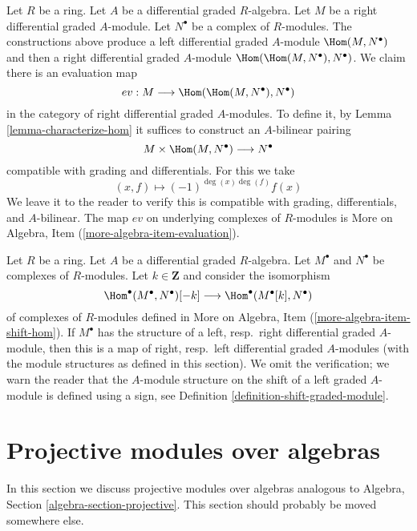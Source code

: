 \begin{remark}
\label{remark-evaluation-map-right}
Let $R$ be a ring. Let $A$ be a differential graded $R$-algebra.
Let $M$ be a right differential graded $A$-module. Let
$N^\bullet$ be a complex of $R$-modules. The constructions above
produce a left differential graded $A$-module $\Hom(M, N^\bullet)$
and then a right differential graded $A$-module
$\Hom(\Hom(M, N^\bullet), N^\bullet)$. We claim there is an evaluation map
$$
ev : M \longrightarrow \Hom(\Hom(M, N^\bullet), N^\bullet)
$$
in the category of right differential graded $A$-modules. To define it, by
Lemma \ref{lemma-characterize-hom} it suffices to construct an
$A$-bilinear pairing
$$
M \times \Hom(M, N^\bullet) \longrightarrow N^\bullet
$$
compatible with grading and differentials. For this we take
$$
(x, f) \longmapsto (-1)^{\deg(x)\deg(f)}f(x)
$$
We leave it to the reader to verify this is compatible with grading,
differentials, and $A$-bilinear. The map $ev$ on underlying complexes
of $R$-modules is More on Algebra, Item (\ref{more-algebra-item-evaluation}).
\end{remark}

\begin{remark}
\label{remark-shift-dual}
Let $R$ be a ring. Let $A$ be a differential graded $R$-algebra.
Let $M^\bullet$ and $N^\bullet$ be complexes of $R$-modules.
Let $k \in \mathbf{Z}$ and consider the isomorphism
$$
\Hom^\bullet(M^\bullet, N^\bullet)[-k]
\longrightarrow
\Hom^\bullet(M^\bullet[k], N^\bullet)
$$
of complexes of $R$-modules defined in
More on Algebra, Item (\ref{more-algebra-item-shift-hom}).
If $M^\bullet$ has the structure of a left, resp.\ right
differential graded $A$-module, then this is a map of
right, resp.\ left differential graded $A$-modules (with the
module structures as defined in this section).
We omit the verification; we warn the reader that the
$A$-module structure on the shift of a left graded $A$-module
is defined using a sign, see
Definition \ref{definition-shift-graded-module}.
\end{remark}






\section{Projective modules over algebras}
\label{section-projectives-over-algebras}

\noindent
In this section we discuss projective modules over algebras analogous to
Algebra, Section \ref{algebra-section-projective}.
This section should probably be moved somewhere else.

